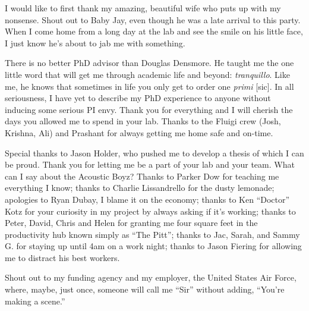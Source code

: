 I would like to first thank my amazing, beautiful wife who puts up with my nonsense. Shout out to Baby Jay, even though he was a late arrival to this party. When I come home from a long day at the lab and see the smile on his little face, I just know he's about to jab me with something.

There is no better PhD advisor than Douglas Densmore. He taught me the one little word that will get me through academic life and beyond: \emph{tranquillo}. Like me, he knows that sometimes in life you only get to order one \emph{primi} [sic]. In all seriousness, I have yet to describe my PhD experience to anyone without inducing some serious PI envy. Thank you for everything and I will cherish the days you allowed me to spend in your lab. Thanks to the Fluigi crew (Josh, Krishna, Ali) and Prashant for always getting me home safe and on-time.

Special thanks to Jason Holder, who pushed me to develop a thesis of which I can be proud. Thank you for letting me be a part of your lab and your team. What can I say about the Acoustic Boyz? Thanks to Parker Dow for teaching me everything I know; thanks to Charlie Lissandrello for the dusty lemonade; apologies to Ryan Dubay, I blame it on the economy; thanks to Ken ``Doctor'' Kotz for your curiosity in my project by always asking if it's working; thanks to Peter, David, Chris and Helen for granting me four square feet in the productivity hub known simply as ``The Pitt''; thanks to Jac, Sarah, and Sammy G. for staying up until 4am on a work night; thanks to Jason Fiering for allowing me to distract his best workers.


Shout out to my funding agency and my employer, the United States Air Force, where, maybe, just once, someone will call me ``Sir'' without adding, ``You're making a scene.''
